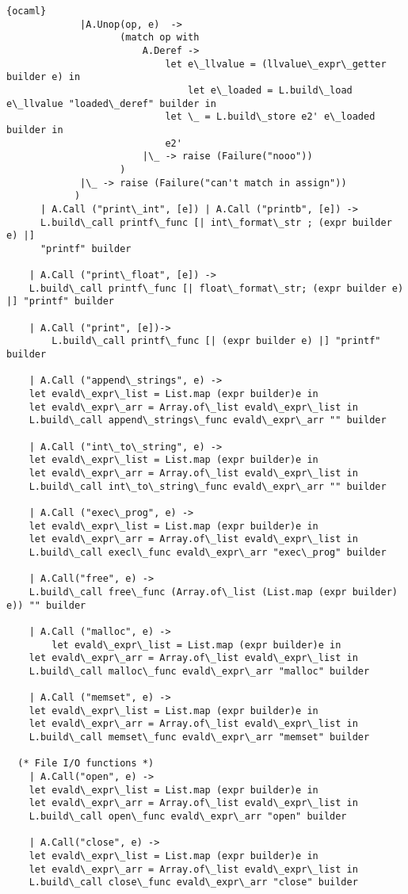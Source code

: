 \begin{lstlisting}{ocaml}
			 |A.Unop(op, e)  ->
					(match op with
						A.Deref ->
							let e\_llvalue = (llvalue\_expr\_getter builder e) in
						        let e\_loaded = L.build\_load e\_llvalue "loaded\_deref" builder in 
							let \_ = L.build\_store e2' e\_loaded builder in
							e2'	
						|\_ -> raise (Failure("nooo"))
					)
			 |\_ -> raise (Failure("can't match in assign"))
			)
      | A.Call ("print\_int", [e]) | A.Call ("printb", [e]) ->
	  L.build\_call printf\_func [| int\_format\_str ; (expr builder e) |]
	  "printf" builder

    | A.Call ("print\_float", [e]) ->
	L.build\_call printf\_func [| float\_format\_str; (expr builder e) |] "printf" builder 

    | A.Call ("print", [e])->
        L.build\_call printf\_func [| (expr builder e) |] "printf" builder

    | A.Call ("append\_strings", e) ->
	let evald\_expr\_list = List.map (expr builder)e in
	let evald\_expr\_arr = Array.of\_list evald\_expr\_list in
	L.build\_call append\_strings\_func evald\_expr\_arr "" builder

    | A.Call ("int\_to\_string", e) ->
	let evald\_expr\_list = List.map (expr builder)e in
	let evald\_expr\_arr = Array.of\_list evald\_expr\_list in
	L.build\_call int\_to\_string\_func evald\_expr\_arr "" builder

    | A.Call ("exec\_prog", e) ->
	let evald\_expr\_list = List.map (expr builder)e in
	let evald\_expr\_arr = Array.of\_list evald\_expr\_list in
	L.build\_call execl\_func evald\_expr\_arr "exec\_prog" builder

    | A.Call("free", e) ->
	L.build\_call free\_func (Array.of\_list (List.map (expr builder) e)) "" builder

    | A.Call ("malloc", e) ->
      	let evald\_expr\_list = List.map (expr builder)e in
	let evald\_expr\_arr = Array.of\_list evald\_expr\_list in
	L.build\_call malloc\_func evald\_expr\_arr "malloc" builder

    | A.Call ("memset", e) ->
	let evald\_expr\_list = List.map (expr builder)e in
	let evald\_expr\_arr = Array.of\_list evald\_expr\_list in
	L.build\_call memset\_func evald\_expr\_arr "memset" builder

  (* File I/O functions *)
    | A.Call("open", e) ->
	let evald\_expr\_list = List.map (expr builder)e in
	let evald\_expr\_arr = Array.of\_list evald\_expr\_list in
	L.build\_call open\_func evald\_expr\_arr "open" builder

    | A.Call("close", e) ->
	let evald\_expr\_list = List.map (expr builder)e in
	let evald\_expr\_arr = Array.of\_list evald\_expr\_list in
  	L.build\_call close\_func evald\_expr\_arr "close" builder


\end{lstlisting}
